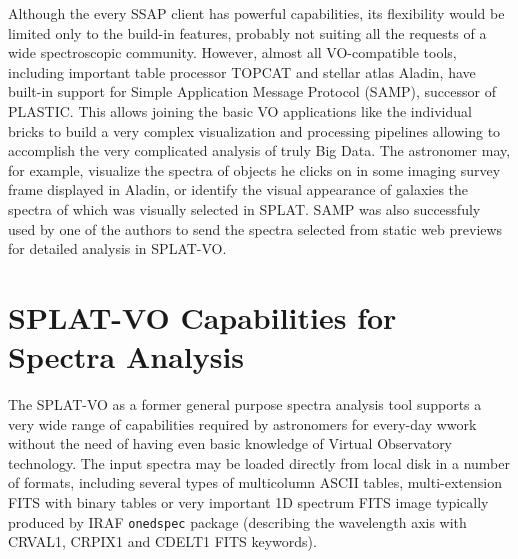 \documentclass[final,authoryear,5p,times,twocolumn]{elsarticle}
\begin{document}
Although the every SSAP client has  powerful capabilities, its flexibility
would be limited only to the build-in features, probably not suiting all the
requests of a wide spectroscopic community. However, almost all VO-compatible
tools, including important table processor TOPCAT and stellar atlas Aladin,
have built-in support for Simple Application Message Protocol (SAMP), successor
of PLASTIC.  This allows joining the basic VO applications like the individual
bricks to build a very complex visualization and processing pipelines allowing
to accomplish the very complicated analysis of truly Big Data.  The astronomer
may, for example, visualize the spectra of objects he clicks on in some imaging
survey frame displayed in Aladin, or identify the visual appearance of galaxies
the spectra of which was visually selected in SPLAT.  SAMP was also successfuly
used by one of the authors to send the spectra selected from   static web
previews for detailed analysis in SPLAT-VO.


\section{SPLAT-VO Capabilities  for Spectra Analysis}

The SPLAT-VO as a former general purpose spectra analysis tool supports a very
wide range of capabilities required by astronomers for every-day wwork without
the need of having even basic knowledge of Virtual Observatory technology. The
input spectra may be loaded directly from local disk in a number of formats,
including several types of multicolumn ASCII tables, multi-extension FITS with
binary tables or very important 1D spectrum FITS image typically produced by
IRAF {\tt onedspec} package (describing the wavelength axis with CRVAL1, CRPIX1
and CDELT1 FITS keywords).   
\end{document}
